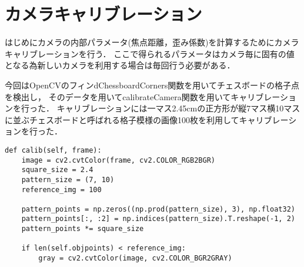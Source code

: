 \section{カメラキャリブレーション}
\label{calib}

はじめにカメラの内部パラメータ(焦点距離，歪み係数)を計算するためにカメラキャリブレーションを行う．
ここで得られるパラメータはカメラ毎に固有の値となる為新しいカメラを利用する場合は毎回行う必要がある．

今回はOpenCVのフィンdChessboardCorners関数を用いてチェスボードの格子点を検出し，
そのデータを用いてcalibrateCamera関数を用いてキャリブレーションを行った．
キャリブレーションには一マス2.45cmの正方形が縦7マス横10マスに並ぶチェスボードと呼ばれる格子模様の画像100枚を利用してキャリブレーションを行った．

\begin{lstlisting}[caption=calibration code,label=calib_code]
def calib(self, frame):                                                                                                                                      
    image = cv2.cvtColor(frame, cv2.COLOR_RGB2BGR)                                                                                                           
    square_size = 2.4                                                                                                                                        
    pattern_size = (7, 10)                                                                                                                                   
    reference_img = 100                                                                                                                                      
                                                                                                                                                            
    pattern_points = np.zeros((np.prod(pattern_size), 3), np.float32)                                                                                        
    pattern_points[:, :2] = np.indices(pattern_size).T.reshape(-1, 2)                                                                                        
    pattern_points *= square_size                                                                                                                            
                                                                                                                                                            
    if len(self.objpoints) < reference_img:                                                                                                                  
        gray = cv2.cvtColor(image, cv2.COLOR_BGR2GRAY)                                                                                                       
                                                                                                                                                            

\end{lstlisting}
